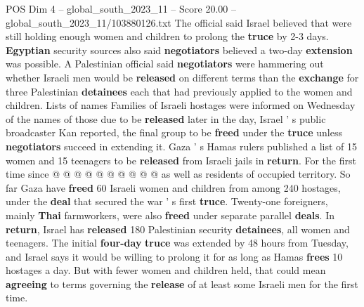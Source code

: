 \begin{textsample}{POS Dim 4 – global\_south\_2023\_11 – Score 20.00 – global\_south\_2023\_11/103880126.txt}
The official said Israel believed that were still holding enough women and children to prolong the \textbf{truce} by 2-3 days. \textbf{Egyptian} security sources also said \textbf{negotiators} believed a two-day \textbf{extension} was possible.
A Palestinian official said \textbf{negotiators} were hammering out whether Israeli men would be \textbf{released} on different terms than the \textbf{exchange} for three Palestinian \textbf{detainees} each that had previously applied to the women and children.
Lists of names Families of Israeli hostages were informed on Wednesday of the names of those due to be \textbf{released} later in the day, Israel ' s public broadcaster Kan reported, the final group to be \textbf{freed} under the \textbf{truce} unless \textbf{negotiators} succeed in extending it.
Gaza ' s Hamas rulers published a list of 15 women and 15 teenagers to be \textbf{released} from Israeli jails in \textbf{return}.
For the first time since @ @ @ @ @ @ @ @ @ @ as well as residents of occupied territory.
So far Gaza have \textbf{freed} 60 Israeli women and children from among 240 hostages, under the \textbf{deal} that secured the war ' s first \textbf{truce}.
Twenty-one foreigners, mainly \textbf{Thai} farmworkers, were also \textbf{freed} under separate parallel \textbf{deals}.
In \textbf{return}, Israel has \textbf{released} 180 Palestinian security \textbf{detainees}, all women and teenagers.
The initial \textbf{four-day} \textbf{truce} was extended by 48 hours from Tuesday, and Israel says it would be willing to prolong it for as long as Hamas \textbf{frees} 10 hostages a day.
But with fewer women and children held, that could mean \textbf{agreeing} to terms governing the \textbf{release} of at least some Israeli men for the first time.

\end{textsample}
